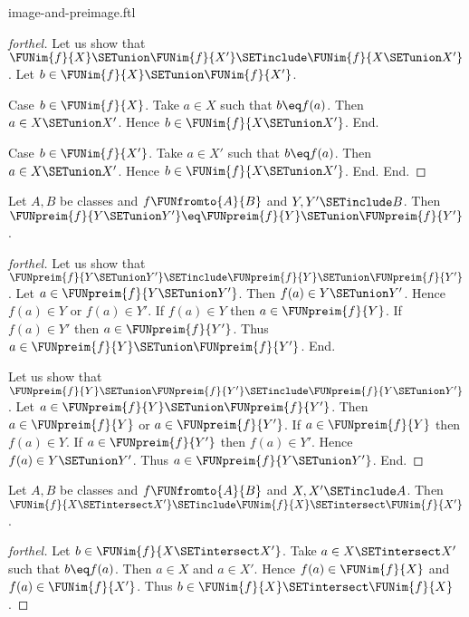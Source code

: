 \documentclass{naproche-library}
\begin{document}
\begin{smodule}[title=Computation Laws for Images and Preimages]{image-and-preimage.ftl}
\begin{proof}[forthel]
  Let us show that $\FUNim{f}{X} \SETunion \FUNim{f}{X'} \SETinclude \FUNim{f}{X \SETunion X'}$.
    Let $b \in \FUNim{f}{X} \SETunion \FUNim{f}{X'}$.

    Case $b \in \FUNim{f}{X}$.
      Take $a \in X$ such that $b \eq f(a)$.
      Then $a \in X \SETunion X'$.
      Hence $b \in \FUNim{f}{X \SETunion X'}$.
    End.

    Case $b \in \FUNim{f}{X'}$.
      Take $a \in X'$ such that $b \eq f(a)$.
      Then $a \in X \SETunion X'$.
      Hence $b \in \FUNim{f}{X \SETunion X'}$.
    End.
  End.
\end{proof}

\begin{proposition}[forthel,id=FOUNDATIONS_07_1547089051910144]
  Let $A, B$ be classes and $f \FUNfromto{A}{B}$ and $Y, Y' \SETinclude B$.
  Then $\FUNpreim{f}{Y \SETunion Y'} \eq \FUNpreim{f}{Y} \SETunion \FUNpreim{f}{Y'}$.
\end{proposition}
\begin{proof}[forthel]
  Let us show that $\FUNpreim{f}{Y \SETunion Y'} \SETinclude \FUNpreim{f}{Y} \SETunion \FUNpreim{f}{Y'}$.
    Let $a \in \FUNpreim{f}{Y \SETunion Y'}$.
    Then $f(a) \in Y \SETunion Y'$.
    Hence $f(a) \in Y$ or $f(a) \in Y'$.
    If $f(a) \in Y$ then $a \in \FUNpreim{f}{Y}$.
    If $f(a) \in Y'$ then $a \in \FUNpreim{f}{Y'}$.
    Thus $a \in \FUNpreim{f}{Y} \SETunion \FUNpreim{f}{Y'}$.
  End.

  Let us show that $\FUNpreim{f}{Y} \SETunion \FUNpreim{f}{Y'} \SETinclude \FUNpreim{f}{Y \SETunion Y'}$.
    Let $a \in \FUNpreim{f}{Y} \SETunion \FUNpreim{f}{Y'}$.
    Then $a \in \FUNpreim{f}{Y}$ or $a \in \FUNpreim{f}{Y'}$.
    If $a \in \FUNpreim{f}{Y}$ then $f(a) \in Y$.
    If $a \in \FUNpreim{f}{Y'}$ then $f(a) \in Y'$.
    Hence $f(a) \in Y \SETunion Y'$.
    Thus $a \in \FUNpreim{f}{Y \SETunion Y'}$.
  End.
\end{proof}

\begin{proposition}[forthel,id=FOUNDATIONS_07_3966130473402368]
  Let $A, B$ be classes and $f \FUNfromto{A}{B}$ and $X, X' \SETinclude A$.
  Then $\FUNim{f}{X \SETintersect X'} \SETinclude \FUNim{f}{X} \SETintersect \FUNim{f}{X'}$.
\end{proposition}
\begin{proof}[forthel]
  Let $b \in \FUNim{f}{X \SETintersect X'}$.
  Take $a \in X \SETintersect X'$ such that $b \eq f(a)$.
  Then $a \in X$ and $a \in X'$.
  Hence $f(a) \in \FUNim{f}{X}$ and $f(a) \in \FUNim{f}{X'}$.
  Thus $b \in \FUNim{f}{X} \SETintersect \FUNim{f}{X}$.
\end{proof}


\end{smodule}
\end{document}
